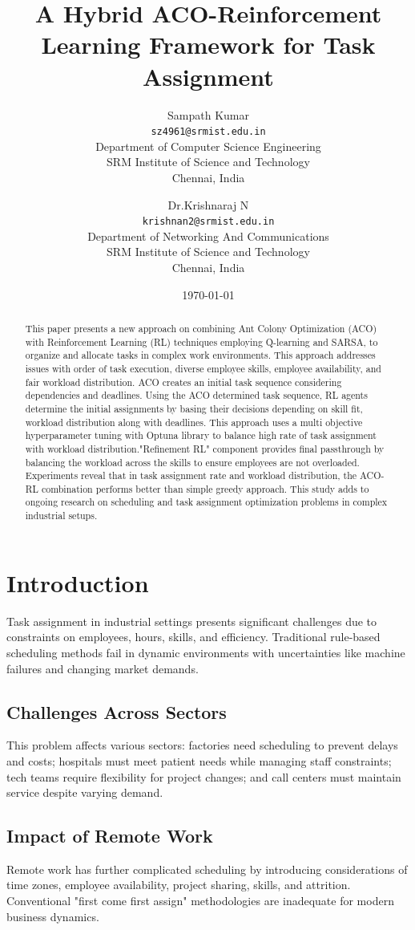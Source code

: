 \documentclass[12pt]{article}
\title{A Hybrid ACO-Reinforcement\\Learning Framework for Task Assignment}
\author{
	Sampath Kumar\\
	\texttt{sz4961@srmist.edu.in}\\
	Department of Computer Science Engineering\\SRM Institute of Science and Technology\\Chennai, India
	\and
	Dr.Krishnaraj N\\
	\texttt{krishnan2@srmist.edu.in}\\
	Department of Networking And Communications\\SRM Institute of Science and Technology\\Chennai, India
}
\date{\today}
\begin{document}
	
	\maketitle
	
	\begin{abstract}
		This paper presents a new approach on combining Ant Colony Optimization (ACO)
		with Reinforcement Learning (RL) techniques employing Q-learning and SARSA,
		to organize and allocate tasks in complex work environments. This approach addresses
		issues with order of task execution, diverse employee skills, employee availability,
		and fair workload distribution. ACO creates an initial task sequence considering
		dependencies and deadlines. Using the ACO determined task sequence, RL agents
		determine the initial assignments by basing their decisions depending on skill
		fit, workload distribution along with deadlines. This approach uses a multi objective
		hyperparameter tuning with Optuna library to balance high rate of task assignment
		with workload distribution."Refinement RL" component provides final passthrough
		by balancing the workload across the skills to ensure employees are not overloaded.
		Experiments reveal that in task assignment rate and workload distribution, the
		ACO-RL combination performs better than simple greedy approach. This study
		adds to ongoing research on scheduling and task assignment optimization
		problems in complex industrial setups.
	\end{abstract}
	
	\section{\label{sec}Introduction}
	Task assignment in industrial settings presents significant challenges due to constraints on employees, hours, skills, and efficiency. Traditional rule-based scheduling methods fail in dynamic environments with uncertainties like machine failures and changing market demands\cite{zhang2022, li2024}.
	\subsection{\label{subsec}Challenges Across Sectors}
	This problem affects various sectors: factories need scheduling to prevent delays and costs; hospitals must meet patient needs while managing staff constraints; tech teams require flexibility for project changes; and call centers must maintain service despite varying demand.
	\subsection{\label{subsec}Impact of Remote Work}
	Remote work has further complicated scheduling by introducing considerations of time zones, employee availability, project sharing, skills, and attrition. Conventional "first come first assign" methodologies are inadequate for modern business dynamics\cite{wang2023}.
\end{document}
